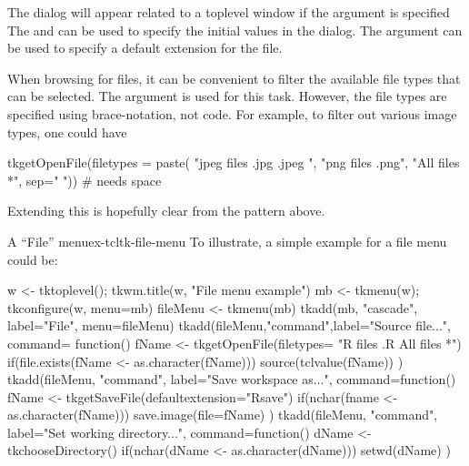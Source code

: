 The dialog will appear related to a toplevel window if the argument
 is specified The
 and
 can be used to specify the
initial values in the dialog.  The
 argument can be used to
specify a default extension for the file.

When browsing for files, it can be convenient to filter the available
file types that can be selected. The  argument is used for this task. However,
the file types are specified using \TCL\/ brace-notation, not \R\/ code. For example,
to filter out various image types, one could have 
\begin{Schunk}
\begin{Sinput}
 tkgetOpenFile(filetypes = paste(
                 "{{jpeg files} {.jpg .jpeg} }",
                 "{{png files} {.png}}",
                 "{{All files} {*}}", sep=" ")) # needs space
\end{Sinput}
\end{Schunk}
Extending this is hopefully clear from the pattern above.

\begin{example}{A ``File'' menu}{ex-tcltk-file-menu}
  To illustrate, a simple example for a file menu could be:
\begin{Schunk}
\begin{Sinput}
 w <- tktoplevel(); tkwm.title(w, "File menu example")
 mb <- tkmenu(w); tkconfigure(w, menu=mb)
 fileMenu <- tkmenu(mb)
 tkadd(mb, "cascade", label="File", menu=fileMenu)
 tkadd(fileMenu,"command",label="Source file...",
       command= function() {
         fName <- tkgetOpenFile(filetypes=
                         "{{R files} {.R}} {{All files} *}")
         if(file.exists(fName <- as.character(fName)))
            source(tclvalue(fName))
       })
 tkadd(fileMenu, "command", label="Save workspace as...",
       command=function() {
         fName <- tkgetSaveFile(defaultextension="Rsave")
         if(nchar(fname <- as.character(fName)))
           save.image(file=fName)
       })
 tkadd(fileMenu, "command", label="Set working directory...",
       command=function() {
         dName <- tkchooseDirectory()
         if(nchar(dName <- as.character(dName)))
           setwd(dName)
       })
\end{Sinput}
\end{Schunk}
\end{example}

